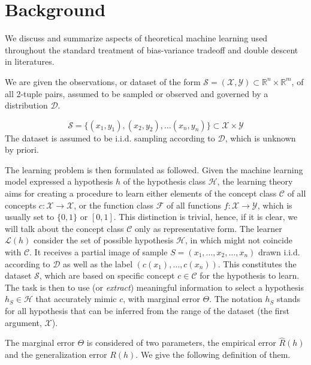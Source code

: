 \section{Background}

We discuss and summarize aspects of theoretical machine learning \cite{STL_Hajek_Maxim_2021,10.5555/2371238,10.5555/2621980} used throughout the standard treatment of bias-variance tradeoff and double descent in literatures.

We are given the observations, or dataset of the form $\mathcal{S}=(\mathcal{X},\mathcal{Y})\subset \mathbb{R}^{n}\times \mathbb{R}^{m}$, of all 2-tuple pairs, assumed to be sampled or observed and governed by a distribution $\mathcal{D}$. 

\begin{equation*}
    \mathcal{S} = \{ (x_1,y_1), (x_2, y_2),\dots(x_n,y_n) \} \subset \mathcal{X}\times \mathcal{Y}
\end{equation*}
The dataset is assumed to be i.i.d. sampling according to $\mathcal{D}$, which is unknown by priori. 

The learning problem is then formulated as followed. Given the machine learning model expressed a hypothesis $h$ of the hypothesis class $\mathcal{H}$, the learning theory aims for creating a procedure to learn either elements of the concept class $\mathcal{C}$ of all concepts $c: \mathcal{X}\to \mathcal{X}$, or the function class $\mathcal{F}$ of all functions $f: \mathcal{X}\to \mathcal{Y}$, which is usually set to $\{0,1\}$ or $[0,1]$. This distinction is trivial, hence, if it is clear, we will talk about the concept class $\mathcal{C}$ only as representative form. The learner $\mathcal{L}(h)$ consider the set of possible hypothesis $\mathcal{H}$, in which might not coincide with $\mathcal{C}$. It receives a partial image of sample $S=(x_{1},\dots,x_{2},\dots,x_n)$ drawn i.i.d. according to $\mathcal{D}$ as well as the label $(c(x_1),\dots,c(x_n))$. This constitutes the dataset $\mathcal{S}$, which are based on specific concept $c\in \mathcal{C}$ for the hypothesis to learn. The task is then to use (or \textit{extract}) meaningful information to select a hypothesis $h_{S}\in \mathcal{H}$ that accurately mimic $c$, with marginal error $\Theta$. The notation $h_{S}$ stands for all hypothesis that can be inferred from the range of the dataset (the first argument, $\mathcal{X}$). 

The marginal error $\Theta$ is considered of two parameters, the empirical error $\hat{R}(h)$ and the generalization error $R(h)$. We give the following definition of them. 

